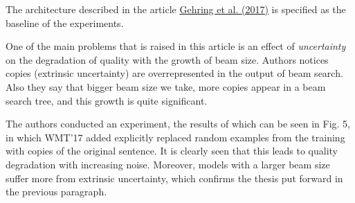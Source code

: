 \documentclass[a4paper,14pt]{extarticle}
\newcommand{\bibref}[3]{\hyperlink{#1}{#2 (#3)}}
\begin{document}
	The architecture described in the article \bibref{fconv}{Gehring et al.}{2017} is specified as the baseline of the experiments.
	
	One of the main problems that is raised in this article is an effect of \textit{uncertainty} on the degradation of quality with the growth of beam size. Authors notices copies (extrinsic uncertainty) are overrepresented in the output of beam search. Also they say that bigger beam size we take, more copies appear in a beam search tree, and this growth is quite significant.
	
	\begin{figure}[t]
	\end{figure}
	
	The authors conducted an experiment, the results of which can be seen in Fig. 5, in which WMT'17 added explicitly replaced random examples from the training with copies of the original sentence. It is clearly seen that this leads to quality degradation with increasing noise. Moreover, models with a larger beam size suffer more from extrinsic uncertainty, which confirms the thesis put forward in the previous paragraph.
	
\end{document}
